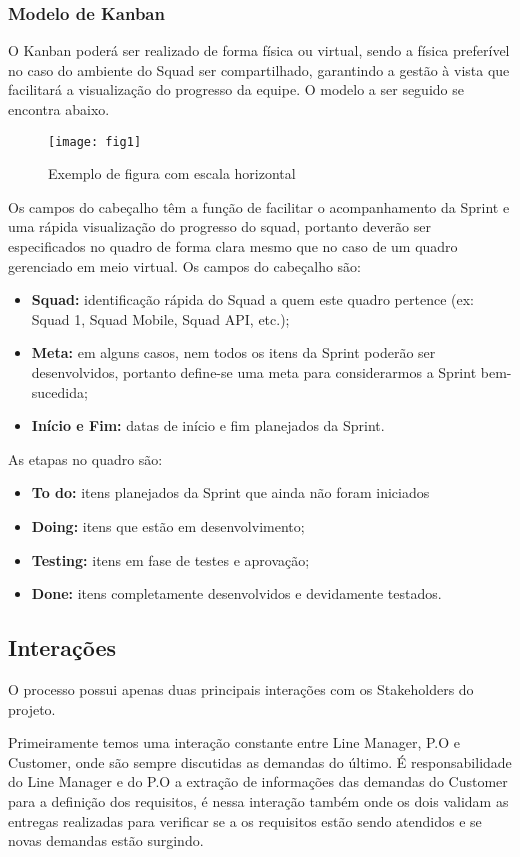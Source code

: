 \documentclass[	DIV=calc,%
							paper=a4,%
							fontsize=12pt,%
							onecolumn]{scrartcl}	 					%
\begin{document}
\subsubsection{Modelo de Kanban}
O Kanban poderá ser realizado de forma física ou virtual, sendo a física preferível no caso do ambiente do Squad ser compartilhado, garantindo a gestão à vista que facilitará a visualização do progresso da equipe. O modelo a ser seguido se encontra abaixo.
\begin{figure}
	\centering
	\texttt{[image: fig1]}
	\caption{Exemplo de figura com escala horizontal}
	\label{Kanban}
\end{figure}
Os campos do cabeçalho têm a função de facilitar o acompanhamento da Sprint e uma rápida visualização do progresso do squad, portanto deverão ser especificados no quadro de forma clara mesmo que no caso de um quadro gerenciado em meio virtual. Os campos do cabeçalho são:
\begin{itemize}
	\item \textbf{Squad:} identificação rápida do Squad a quem este quadro pertence (ex: Squad 1, Squad Mobile, Squad API, etc.);
	\item \textbf{Meta:} em alguns casos, nem todos os itens da Sprint poderão ser desenvolvidos, portanto define-se uma meta para considerarmos a Sprint bem-sucedida;
	\item \textbf{Início e Fim:} datas de início e fim planejados da Sprint.
\end{itemize}
As etapas no quadro são:
\begin{itemize}
	\item \textbf{To do:} itens planejados da Sprint que ainda não foram iniciados
	\item \textbf{Doing:} itens que estão em desenvolvimento;
	\item \textbf{Testing:} itens em fase de testes e aprovação;
	\item \textbf{Done:} itens completamente desenvolvidos e devidamente testados.
\end{itemize}

\subsection{Interações}
O processo possui apenas duas principais interações com os Stakeholders do projeto. 

Primeiramente temos uma interação constante entre Line Manager, P.O e Customer, onde são sempre discutidas as demandas do último. É responsabilidade do Line Manager e do P.O a extração de informações das demandas do Customer para a definição dos requisitos, é nessa interação também onde os dois validam as entregas realizadas para verificar se a os requisitos estão sendo atendidos e se novas demandas estão surgindo. 
\end{document}
